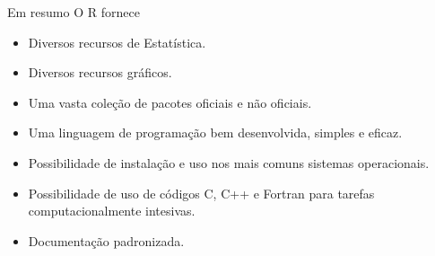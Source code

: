 \documentclass[
  ignorenonframetext,
  serif,
  professionalfont,
  usenames,
  dvipsnames,
  aspectratio = 169]{beamer}
\providecommand{\tightlist}{%
  \setlength{\itemsep}{0pt}\setlength{\parskip}{0pt}}
\renewcommand{\tightlist}{%
  \setlength{\itemsep}{0\baselineskip}
  \setlength{\parskip}{0.25\baselineskip}
}
\begin{document}
\begin{frame}{Em resumo}
\label{em-resumo}
O R fornece

\begin{itemize}
\tightlist
\item
  Diversos recursos de Estatística.
\item
  Diversos recursos gráficos.
\item
  Uma vasta coleção de pacotes oficiais e não oficiais.
\item
  Uma linguagem de programação bem desenvolvida, simples e eficaz.
\item
  Possibilidade de instalação e uso nos mais comuns sistemas
  operacionais.
\item
  Possibilidade de uso de códigos C, C++ e Fortran para tarefas
  computacionalmente intesivas.
\item
  Documentação padronizada.
\end{itemize}
\end{frame}
\end{document}
